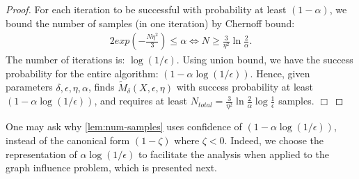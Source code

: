 \begin{proof}
  For each iteration to be successful with probability at least $(1-\alpha)$, we bound the number of
samples (in one iteration) by Chernoff bound:
\begin{align} \label{eq:4}
  2 exp \left( - \frac{N \eta^2}{3} \right) \leq \alpha
    \iff N \geq \frac{3}{\eta^2}\ln{\frac{2}{\alpha}}.
\end{align}
The number of iterations is: $\log(1/\epsilon)$. Using union bound, we have the success probability for
the entire algorithm: $(1 - \alpha \log(1/\epsilon))$. Hence, given  parameters
$\delta, \epsilon, \eta, \alpha$,     finds
$\widetilde{M}_\delta(X, \epsilon, \eta)$ with success probability at least $(1 - \alpha \log(1/\epsilon))$, and
requires at least $N_{\textit{total}} = \frac{3}{\eta^2}\ln{\frac{2}{\alpha}}
\log{\frac{1}{\epsilon}}$ samples. $\Box$
\end{proof}
%
One may ask why \cref{lem:num-samples} uses confidence of $(1 - \alpha \log(1/\epsilon))$, instead of the canonical form $(1 - \zeta)$ where $\zeta < 0$. Indeed, we choose the representation of $\alpha \log(1/\epsilon)$ to facilitate the analysis when applied to the graph influence problem, which is presented next.

